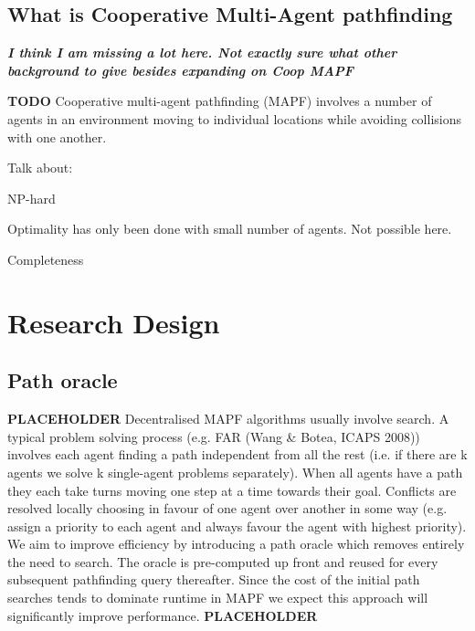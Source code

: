 \documentclass[a4paper,11pt]{article}
\begin{document}

\subsection{What is Cooperative Multi-Agent pathfinding}
\noindent \textit{\textbf{I think I am missing a lot here. Not exactly sure what other background to give besides expanding on Coop MAPF}}

\textbf{TODO} Cooperative multi-agent pathfinding (MAPF) involves a number of agents in an environment moving to individual locations while avoiding collisions with one another.

Talk about: 
\begin{compactitem}
	\item NP-hard
	\item Optimality has only been done with small number of agents. Not possible here.
	\item Completeness
\end{compactitem}



\section{Research Design}

\label{Research}
\subsection{Path oracle}

\cite{strasser2015compressing}


\noindent \textbf{PLACEHOLDER} Decentralised MAPF algorithms usually involve search. A typical problem solving process (e.g. FAR (Wang \& Botea, ICAPS 2008)) involves each agent finding a path independent from all the rest (i.e. if there are k agents we solve k single-agent problems separately). When all agents have a path they each take turns moving one step at a time towards their goal. Conflicts are resolved locally choosing in favour of one agent over another in some way (e.g. assign a priority to each agent and always favour the agent with highest priority). We aim to improve efficiency by introducing a path oracle which removes entirely the need to search. The oracle is pre-computed up front and reused for every subsequent pathfinding query thereafter. Since the cost of the initial path searches tends to dominate runtime in MAPF we expect this approach will significantly improve performance. \textbf{PLACEHOLDER}
\end{document}
